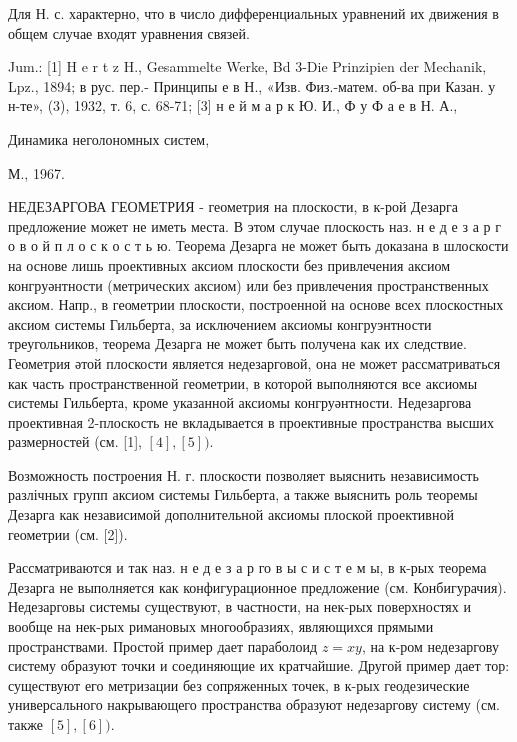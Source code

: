 \documentclass[10pt]{article}
\begin{document}
Для Н. с. характерно, что в число дифференциальных уравнений их движения в общем случае входят уравнения связей.



Jum.: [1] H e r t z H., Gesammelte Werke, Bd 3-Die Prinzipien der Mechanik, Lpz., 1894; в рус. пер.- Принципы е в Н., «Изв. Физ.-матем. об-ва при Казан. у н-те», (3), 1932, т. 6, с. 68-71; [3] н е й м а р к Ю. И., Ф у Ф а е в Н. А.,

Динамика неголономных систем,

М., 1967.



НЕДЕЗАРГОВА ГЕОМЕТРИЯ - геометрия на плоскости, в к-рой Дезарга предложение может не иметь места. В этом случае плоскость наз. н е д е з а р г о в о й п л о с к о с т ь ю. Теорема Дезарга не может быть доказана в шлоскости на основе лишь проективных аксиом плоскости без привлечения аксиом конгруәнтности (метрических аксиом) или без привлечения пространственных аксиом. Напр., в геометрии плоскости, построенной на основе всех плоскостных аксиом системы Гильберта, за исключением аксиомы конгруэнтности треугольников, теорема Дезарга не может быть получена как их следствие. Геометрия әтой плоскости является недезарговой, она не может рассматриваться как часть пространственной геометрии, в которой выполняются все аксиомы системы Гильберта, кроме указанной аксиомы конгруәнтности. Недезаргова проективная 2-плоскость не вкладывается в проективные пространства высших размерностей (см. [1], $[4],[5])$.



Возможность построения Н. г. плоскости позволяет выяснить независимость разлічных групп аксиом системы Гильберта, а также выяснить роль теоремы Дезарга как независимой дополнительной аксиомы плоской проективной геометрии (см. [2]).



Рассматриваются и так наз. н е д е з а р го в ы с и с т е м ы, в к-рых теорема Дезарга не выполняется как конфигурационное предложение (см. Конбигурачия). Недезарговы системы существуют, в частности, на нек-рых поверхностях и вообще на нек-рых римановых многообразиях, являющихся прямыми пространствами. Простой пример дает параболоид $z=x y$, на к-ром недезаргову систему образуют точки и соединяющие их кратчайшие. Другой пример дает тор: существуют его метризации без сопряженных точек, в к-рых геодезические универсального накрывающего пространства образуют недезаргову систему (см. также $[5],[6])$.
\end{document}
